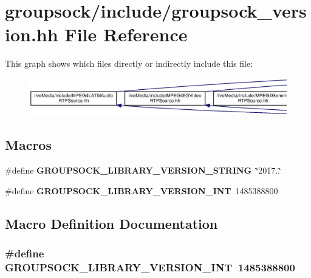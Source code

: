 \section{groupsock/include/groupsock\+\_\+version.hh File Reference}
\label{groupsock__version_8hh}
This graph shows which files directly or indirectly include this file\+:
\nopagebreak
\begin{figure}[H]
\begin{center}
\leavevmode
\includegraphics[width=350pt]{groupsock__version_8hh__dep__incl}
\end{center}
\end{figure}
\subsection*{Macros}
\begin{DoxyCompactItemize}
\item 
\#define {\bf G\+R\+O\+U\+P\+S\+O\+C\+K\+\_\+\+L\+I\+B\+R\+A\+R\+Y\+\_\+\+V\+E\+R\+S\+I\+O\+N\+\_\+\+S\+T\+R\+I\+N\+G}~\char`\"{}2017..\char`\"{}
\item 
\#define {\bf G\+R\+O\+U\+P\+S\+O\+C\+K\+\_\+\+L\+I\+B\+R\+A\+R\+Y\+\_\+\+V\+E\+R\+S\+I\+O\+N\+\_\+\+I\+N\+T}~1485388800
\end{DoxyCompactItemize}


\subsection{Macro Definition Documentation}
\subsubsection[{G\+R\+O\+U\+P\+S\+O\+C\+K\+\_\+\+L\+I\+B\+R\+A\+R\+Y\+\_\+\+V\+E\+R\+S\+I\+O\+N\+\_\+\+I\+N\+T}]{\setlength{\rightskip}{0pt plus 5cm}\#define G\+R\+O\+U\+P\+S\+O\+C\+K\+\_\+\+L\+I\+B\+R\+A\+R\+Y\+\_\+\+V\+E\+R\+S\+I\+O\+N\+\_\+\+I\+N\+T~1485388800}\label{groupsock__version_8hh_a3468633460de46ee43fe309ef5ad5caa}


